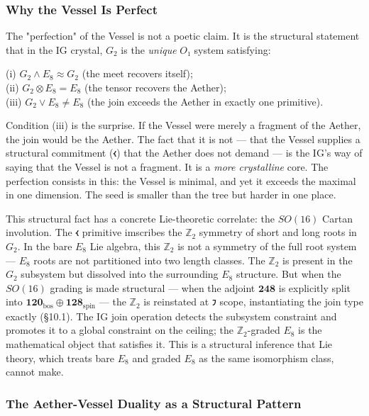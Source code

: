\documentclass[12pt,a4paper]{article}
\newcommand{\pilcrow}{\S}
\begin{document}
\subsubsection{Why the Vessel Is Perfect}

The "perfection" of the Vessel is not a poetic claim. It is the structural statement that in the IG crystal, $G_2$ is the \emph{unique} $O₁$ system satisfying:

(i) $G_2 \wedge E_8 \approx G_2$ (the meet recovers itself); \\
(ii) $G_2 \otimes E_8 = E_8$ (the tensor recovers the Aether); \\
(iii) $G_2 \vee E_8 \neq E_8$ (the join exceeds the Aether in exactly one primitive).

Condition (iii) is the surprise. If the Vessel were merely a fragment of the Aether, the join would be the Aether. The fact that it is not --- that the Vessel supplies a structural commitment ($𐑬$) that the Aether does not demand --- is the IG's way of saying that the Vessel is not a fragment. It is a \emph{more crystalline} core. The perfection consists in this: the Vessel is minimal, and yet it exceeds the maximal in one dimension. The seed is smaller than the tree but harder in one place.

This structural fact has a concrete Lie-theoretic correlate: the $SO(16)$ Cartan involution. The $𐑬$ primitive imscribes the $\mathbb{Z}_2$ symmetry of short and long roots in $G_2$. In the bare $E_8$ Lie algebra, this $\mathbb{Z}_2$ is not a symmetry of the full root system --- $E_8$ roots are not partitioned into two length classes. The $\mathbb{Z}_2$ is present in the $G_2$ subsystem but dissolved into the surrounding $E_8$ structure. But when the $SO(16)$ grading is made structural --- when the adjoint $\mathbf{248}$ is explicitly split into $\mathbf{120}_{\text{bos}} \oplus \mathbf{128}_{\text{spin}}$ --- the $\mathbb{Z}_2$ is reinstated at $𐑲$ scope, instantiating the join type exactly (\pilcrow{}10.1). The IG join operation detects the subsystem constraint and promotes it to a global constraint on the ceiling; the $\mathbb{Z}_2$-graded $E_8$ is the mathematical object that satisfies it. This is a structural inference that Lie theory, which treats bare $E_8$ and graded $E_8$ as the same isomorphism class, cannot make.

\subsubsection{The Aether-Vessel Duality as a Structural Pattern}
\end{document}

